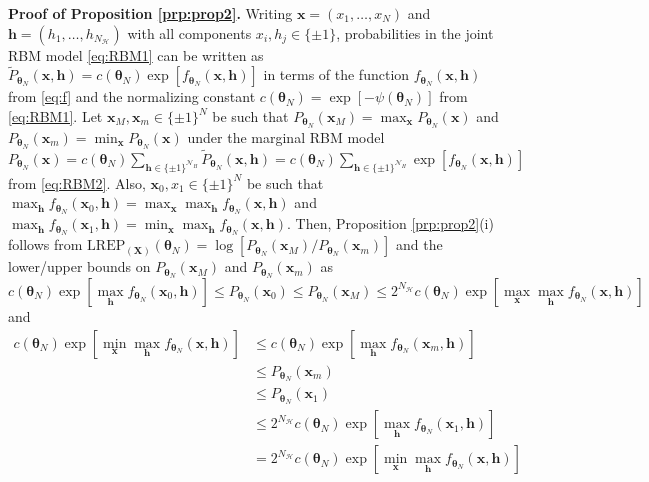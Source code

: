 \documentclass[numbib]{imamat}
\theoremstyle{theorem}
\theoremstyle{lemma}
\theoremstyle{example}
\theoremstyle{corollary}
\theoremstyle{definition}
\theoremstyle{remark}
\theoremstyle{approximation}
\theoremstyle{scheme}
\newcommand{\REP}{\mathrm{LREP}}
\begin{document}
\textbf{Proof of Proposition \ref{prp:prop2}.}
Writing \(\boldsymbol x=(x_1,\ldots,x_N)\) and \(\boldsymbol h = (h_1,\ldots,h_{N_{\mathcal{H}}})\) with all components \(x_i,h_j\in\{\pm 1\}\), probabilities in the joint RBM model \eqref{eq:RBM1} can be written as \(\tilde{P}_{\boldsymbol \theta_N} (\boldsymbol x, \boldsymbol h) = c(\boldsymbol \theta_N)\exp[ f_{\boldsymbol \theta_N} (\boldsymbol x, \boldsymbol h)]\) in terms of the function \(f_{\boldsymbol \theta_N} (\boldsymbol x, \boldsymbol h)\) from \eqref{eq:f} and the normalizing constant \(c(\boldsymbol \theta_N)= \exp [-\psi(\boldsymbol \theta_N)]\) from \eqref{eq:RBM1}. Let \(\boldsymbol x_M, \boldsymbol x_m\in\{\pm 1\}^N\) be such that \(P_{\boldsymbol \theta_N} (\boldsymbol x_M) = \max_{\boldsymbol x}P_{\boldsymbol \theta_N} (\boldsymbol x)\) and \(P_{\boldsymbol \theta_N} (\boldsymbol x_m) = \min_{\boldsymbol x}P_{\boldsymbol \theta_N} (\boldsymbol x)\) under the marginal RBM model \(P_{\boldsymbol \theta_N} (\boldsymbol x) = c(\boldsymbol \theta_N)\sum_{\boldsymbol h \in\{\pm 1\}^{\mathcal{N}_H}} \tilde{P}_{\boldsymbol \theta_N} (\boldsymbol x, \boldsymbol h)= c(\boldsymbol \theta_N)\sum_{\boldsymbol h \in\{\pm 1\}^{\mathcal{N}_H}} \exp[ f_{\boldsymbol \theta_N} (\boldsymbol x, \boldsymbol h)]\) from \eqref{eq:RBM2}. Also, \(\boldsymbol x_0,x_1\in\{\pm 1\}^N\) be such that \(\max_{\boldsymbol h}f_{\boldsymbol \theta_N} (\boldsymbol x_0, \boldsymbol h)=\max_{\boldsymbol x}\max_{\boldsymbol h}f_{\boldsymbol \theta_N} (\boldsymbol x , \boldsymbol h)\) and \(\max_{\boldsymbol h}f_{\boldsymbol \theta_N} (\boldsymbol x_1, \boldsymbol h)=\min_{\boldsymbol x}\max_{\boldsymbol h}f_{\boldsymbol \theta_N} (\boldsymbol x , \boldsymbol h)\). Then, Proposition \ref{prp:prop2}(i) follows from \(\REP_{(\boldsymbol X)}(\boldsymbol \theta_N) = \log[P_{\boldsymbol \theta_N} (\boldsymbol x_M) /P_{\boldsymbol \theta_N} (\boldsymbol x_m) ]\) and the lower/upper bounds on \(P_{\boldsymbol \theta_N} (\boldsymbol x_M)\) and \(P_{\boldsymbol \theta_N} (\boldsymbol x_m)\) as
\[
c(\boldsymbol \theta_N) \exp[\max_{\boldsymbol h}f_{\boldsymbol \theta_N} (\boldsymbol x_0 , \boldsymbol h)]
\leq P_{\boldsymbol \theta_N} (\boldsymbol x_0) \leq  P_{\boldsymbol \theta_N} (\boldsymbol x_M) \leq  2^{N_{\mathcal{H}}} c(\boldsymbol \theta_N) \exp[\max_{\boldsymbol x}\max_{\boldsymbol h}f_{\boldsymbol \theta_N} (\boldsymbol x, \boldsymbol h)]
\]
and
\begin{align*}
c(\boldsymbol \theta_N) \exp[\min_{\boldsymbol x}\max_{\boldsymbol h}f_{\boldsymbol \theta_N} (\boldsymbol x , \boldsymbol h)] &\leq c(\boldsymbol \theta_N) \exp[ \max_{\boldsymbol h}f_{\boldsymbol \theta_N} (\boldsymbol x_m , \boldsymbol h)] \\
&\leq P_{\boldsymbol \theta_N} (\boldsymbol x_m) \\
&\leq P_{\boldsymbol \theta_N} (\boldsymbol x_1) \\ 
&\leq 2^{N_{\mathcal{H}}} c(\boldsymbol \theta_N) \exp[ \max_{\boldsymbol h}f_{\boldsymbol \theta_N} (\boldsymbol x_1 , \boldsymbol h)]\\
&=2^{N_{\mathcal{H}}} c(\boldsymbol \theta_N) \exp[\min_{\boldsymbol x}\max_{\boldsymbol h}f_{\boldsymbol \theta_N} (\boldsymbol x , \boldsymbol h)]
\end{align*}
\end{document}
